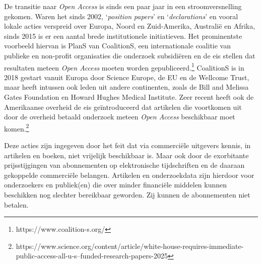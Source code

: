 \documentclass[smallauthor, chapterhaspagenum, nochapterinheader, pagenuminheader,  bigchapnum,medium2, tocpages,  garamond, titleinheader]{jote-book}
\begin{document}
	De transitie naar \emph{Open Access} is sinds een paar jaar in een stroomversnelling gekomen. Waren het sinds 2002, ‘\emph{position}\emph{ papers}' en ‘\emph{d}\emph{eclarations}' en vooral lokale acties verspreid over Europa, Noord en Zuid-Amerika, Australië en Afrika, sinds 2015 is er een aantal brede institutionele initiatieven. Het prominentste voorbeeld hiervan is PlanS van CoalitionS, een internationale coalitie van publieke en non-profit organisaties die onderzoek subsidiëren en de eis stellen dat resultaten meteen \emph{Open Access} moeten worden gepubliceerd.\footnote{https://www.coalition-s.org/} CoalitionS is in 2018 gestart vanuit Europa door Science Europe, de EU en de Wellcome Trust, maar heeft intussen ook leden uit andere continenten, zoals de Bill and Melissa Gates Foundation en Howard Hughes Medical Institute. Zeer recent heeft ook de Amerikaanse overheid de eis geïntroduceerd dat artikelen die voortkomen uit door de overheid betaald onderzoek meteen \emph{Open Access} beschikbaar moet komen.\footnote{https://www.science.org/content/article/white-house-requires-immediate-public-access-all-u-s--funded-research-papers-2025}



	Deze acties zijn ingegeven door het feit dat via commerciële uitgevers kennis, in artikelen en boeken, niet vrijelijk beschikbaar is. Maar ook door de exorbitante prijsstijgingen van abonnementen op elektronische tijdschriften en de daaraan gekoppelde commerciële belangen. Artikelen en onderzoekdata zijn hierdoor voor onderzoekers en publiek(en) die over minder financiële middelen kunnen beschikken nog slechter bereikbaar geworden. Zij kunnen de abonnementen niet betalen.
\end{document}
